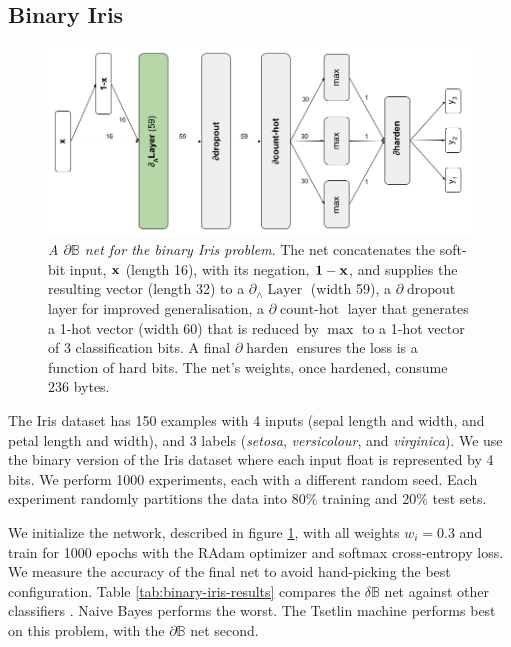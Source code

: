\documentclass{article} %
\begin{document}
\subsection{Binary Iris}

\begin{figure}[t!]
	\centering
	\includegraphics[width=1.0\textwidth]{binary-iris-architecture.png}
	\caption{{\em A $\partial\mathbb{B}$ net for the binary Iris problem}. The net concatenates the soft-bit input, ${\bf x}$ (length 16), with its negation, ${\bf 1 - x}$, and supplies the resulting vector (length 32) to a $\partial_{\wedge}\!\operatorname{Layer}$ (width 59), a $\partial\!\operatorname{dropout}$ layer for improved generalisation, a $\partial\!\operatorname{count-hot}$ layer that generates a 1-hot vector (width 60) that is reduced by $\operatorname{max}$ to a 1-hot vector of 3 classification bits. A final $\partial\!\operatorname{harden}$ ensures the loss is a function of hard bits. The net's weights, once hardened, consume $236$ bytes.}
	\label{fig:binary-iris-architecture}
\end{figure}

The Iris dataset has 150 examples with 4 inputs (sepal length and width, and petal length and width), and 3 labels ({\em setosa}, {\em versicolour}, and {\em virginica}). We use the binary version of the Iris dataset \citep{binary-iris-dataset} where each input float is represented by 4 bits. We perform 1000 experiments, each with a different random seed. Each experiment randomly partitions the data into 80\% training and 20\% test sets. 

We initialize the network, described in figure \ref{fig:binary-iris-architecture}, with all weights $w_{i} = 0.3$ and train for 1000 epochs with the RAdam optimizer and softmax cross-entropy loss. We measure the accuracy of the final net to avoid hand-picking the best configuration. Table \ref{tab:binary-iris-results} compares the $\delta\mathbb{B}$ net against other classifiers  \citep{granmo18}. Naive Bayes performs the worst. The Tsetlin machine performs best on this problem, with the $\partial\mathbb{B}$ net second.
\end{document}
